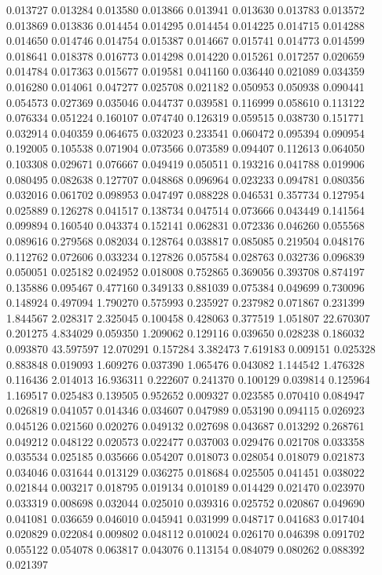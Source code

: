 0.013727
0.013284
0.013580
0.013866
0.013941
0.013630
0.013783
0.013572
0.013869
0.013836
0.014454
0.014295
0.014454
0.014225
0.014715
0.014288
0.014650
0.014746
0.014754
0.015387
0.014667
0.015741
0.014773
0.014599
0.018641
0.018378
0.016773
0.014298
0.014220
0.015261
0.017257
0.020659
0.014784
0.017363
0.015677
0.019581
0.041160
0.036440
0.021089
0.034359
0.016280
0.014061
0.047277
0.025708
0.021182
0.050953
0.050938
0.090441
0.054573
0.027369
0.035046
0.044737
0.039581
0.116999
0.058610
0.113122
0.076334
0.051224
0.160107
0.074740
0.126319
0.059515
0.038730
0.151771
0.032914
0.040359
0.064675
0.032023
0.233541
0.060472
0.095394
0.090954
0.192005
0.105538
0.071904
0.073566
0.073589
0.094407
0.112613
0.064050
0.103308
0.029671
0.076667
0.049419
0.050511
0.193216
0.041788
0.019906
0.080495
0.082638
0.127707
0.048868
0.096964
0.023233
0.094781
0.080356
0.032016
0.061702
0.098953
0.047497
0.088228
0.046531
0.357734
0.127954
0.025889
0.126278
0.041517
0.138734
0.047514
0.073666
0.043449
0.141564
0.099894
0.160540
0.043374
0.152141
0.062831
0.072336
0.046260
0.055568
0.089616
0.279568
0.082034
0.128764
0.038817
0.085085
0.219504
0.048176
0.112762
0.072606
0.033234
0.127826
0.057584
0.028763
0.032736
0.096839
0.050051
0.025182
0.024952
0.018008
0.752865
0.369056
0.393708
0.874197
0.135886
0.095467
0.477160
0.349133
0.881039
0.075384
0.049699
0.730096
0.148924
0.497094
1.790270
0.575993
0.235927
0.237982
0.071867
0.231399
1.844567
2.028317
2.325045
0.100458
0.428063
0.377519
1.051807
22.670307
0.201275
4.834029
0.059350
1.209062
0.129116
0.039650
0.028238
0.186032
0.093870
43.597597
12.070291
0.157284
3.382473
7.619183
0.009151
0.025328
0.883848
0.019093
1.609276
0.037390
1.065476
0.043082
1.144542
1.476328
0.116436
2.014013
16.936311
0.222607
0.241370
0.100129
0.039814
0.125964
1.169517
0.025483
0.139505
0.952652
0.009327
0.023585
0.070410
0.084947
0.026819
0.041057
0.014346
0.034607
0.047989
0.053190
0.094115
0.026923
0.045126
0.021560
0.020276
0.049132
0.027698
0.043687
0.013292
0.268761
0.049212
0.048122
0.020573
0.022477
0.037003
0.029476
0.021708
0.033358
0.035534
0.025185
0.035666
0.054207
0.018073
0.028054
0.018079
0.021873
0.034046
0.031644
0.013129
0.036275
0.018684
0.025505
0.041451
0.038022
0.021844
0.003217
0.018795
0.019134
0.010189
0.014429
0.021470
0.023970
0.033319
0.008698
0.032044
0.025010
0.039316
0.025752
0.020867
0.049690
0.041081
0.036659
0.046010
0.045941
0.031999
0.048717
0.041683
0.017404
0.020829
0.022084
0.009802
0.048112
0.010024
0.026170
0.046398
0.091702
0.055122
0.054078
0.063817
0.043076
0.113154
0.084079
0.080262
0.088392
0.021397
